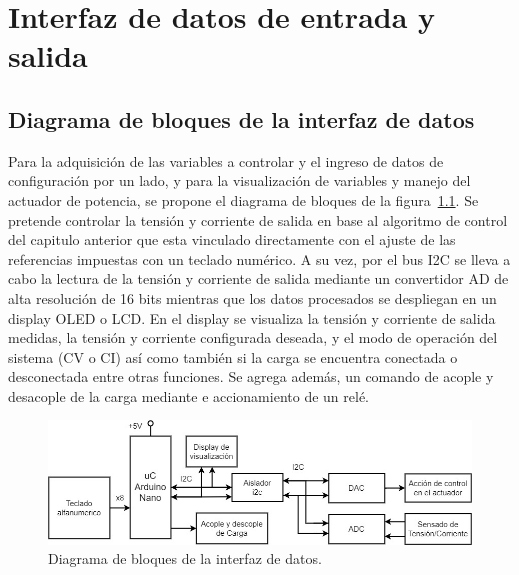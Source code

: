 \chapter{Interfaz de datos de entrada y salida}

\label{C:Interfaz de datos de entrada y salida}

\section{Diagrama de bloques de la interfaz de datos}
Para la adquisición de las variables a controlar y el ingreso de datos de configuración por un lado, y para la visualización de variables y manejo del actuador de potencia, se propone el diagrama de bloques de la figura~\ref{F:diagrama_digital}. Se pretende controlar la tensión y corriente de salida en base al algoritmo de control del capitulo anterior que esta vinculado directamente con el ajuste de las referencias impuestas con un teclado numérico. A su vez, por el bus I2C se lleva a cabo la lectura de la tensión y corriente de salida mediante un convertidor AD de alta resolución de 16 bits mientras que los datos procesados se despliegan en un display OLED o LCD. En el display se visualiza la tensión y corriente de salida medidas, la tensión y corriente configurada deseada, y el modo de operación del sistema (CV o CI) así como también si la carga se encuentra conectada o desconectada entre otras funciones. Se agrega además, un comando de acople y desacople de la carga mediante e accionamiento de un relé.

\begin{figure} [H]
    \centering
    \includegraphics[scale=0.5]{./imagenes/diagrama_digital.jpg}
    \caption{Diagrama de bloques de la interfaz de datos.}
    \label{F:diagrama_digital}
\end{figure}

